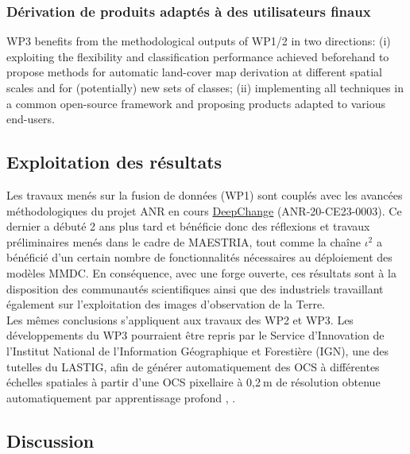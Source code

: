 \subsubsection{Dérivation de produits adaptés à des utilisateurs finaux}


WP3 benefits from the methodological outputs of WP1/2 in two directions: (i) exploiting the flexibility
and classification performance achieved beforehand to propose methods for automatic land-cover map
derivation at different spatial scales and for (potentially) new sets of classes; (ii) implementing all techniques
in a common open-source framework and proposing products adapted to various end-users.


\subsection{Exploitation des résultats}
Les travaux menés sur la fusion de données (WP1) sont couplés avec les avancées méthodologiques du projet ANR en cours \href{https://anr.hal.science/search/index/?q=*&anrProjectReference_s=ANR-20-CE23-0003}{DeepChange} (ANR-20-CE23-0003). Ce dernier a débuté 2 ans plus tard et bénéficie donc des réflexions et travaux préliminaires menés dans le cadre de MAESTRIA, tout comme la chaîne $\iota^2$ a bénéficié d'un certain nombre de fonctionnalités nécessaires au déploiement des modèles MMDC. En conséquence, avec une forge ouverte, ces résultats sont à la disposition des communautés scientifiques ainsi que des industriels travaillant également sur l'exploitation des images d'observation de la Terre.\\
Les mêmes conclusions s'appliquent aux travaux des WP2 et WP3. Les développements du WP3 pourraient être repris par le Service d'Innovation de l'Institut National de l'Information Géographique et Forestière (IGN), une des tutelles du LASTIG, afin de générer automatiquement des OCS à différentes échelles spatiales à partir d'une OCS pixellaire à 0,2$\:$m de résolution obtenue automatiquement par apprentissage profond \cite{garioud2023flair}, \cite{garioud2023flair2}.


\subsection{Discussion} 

